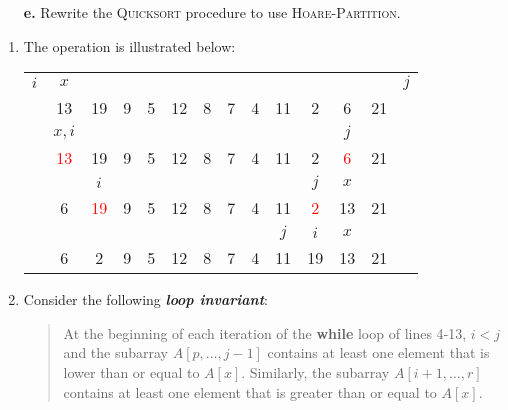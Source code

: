\documentclass{report}
\makeatletter
\renewenvironment{framed}{%
 \def\FrameCommand##1{\hskip\@totalleftmargin
 \fboxsep=\FrameSep\fbox{##1}}%
 \MakeFramed {\advance\hsize-\width
   \@totalleftmargin\z@ \linewidth\hsize
   \@setminipage}}%
 {\par\unskip\endMakeFramed}
\makeatother
\begin{document}
\begin{enumerate}
{\begin{enumerate}
\item[\textbf{e.}]{Rewrite the \textsc{Quicksort} procedure to use
\textsc{Hoare-Partition}.}
\end{enumerate}
}

\begin{framed}
\begin{enumerate}
\item{The operation is illustrated below:

\begin{center}
\begin{tabular}{cccccccccccccc}
  $i$ & $x$                 &                     &   &   &    &   &   &   &     &                    &                    &    & $j$\\
      & 13                  & 19                  & 9 & 5 & 12 & 8 & 7 & 4 & 11  & 2                  & 6                  & 21 &    \\
      & $x, i$              &                     &   &   &    &   &   &   &     &                    & $j$                &    &    \\
      & \textcolor{red}{13} & 19                  & 9 & 5 & 12 & 8 & 7 & 4 & 11  & 2                  & \textcolor{red}{6} & 21 &    \\
      &                     & $i$                 &   &   &    &   &   &   &     & $j$                & $x$                &    &    \\
      & 6                   & \textcolor{red}{19} & 9 & 5 & 12 & 8 & 7 & 4 & 11  & \textcolor{red}{2} & 13                 & 21 &    \\
      &                     &                     &   &   &    &   &   &   & $j$ & $i$                & $x$                &    &    \\
      & 6                   & 2                   & 9 & 5 & 12 & 8 & 7 & 4 & 11  & 19                 & 13                 & 21 &
\end{tabular}
\end{center}
}
\item{Consider the following \textbf{\emph{loop invariant}}:
\begin{quote}
At the beginning of each iteration of the \textbf{while} loop of lines 4{-}13,
$i < j$ and the subarray $A[p, \dots, j - 1]$ contains at least one element that
is lower than or equal to $A[x]$. Similarly, the subarray $A[i + 1, \dots, r]$
contains at least one element that is greater than or equal to $A[x]$.
\end{quote}
}
\end{enumerate}
\end{framed}
\end{enumerate}
\end{document}
